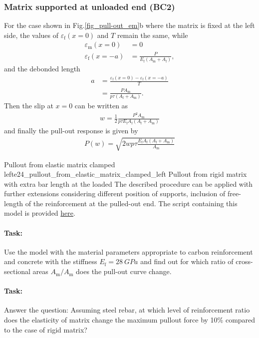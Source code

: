\documentclass[main.tex]{subfiles}
\begin{document}
\subsubsection{Matrix supported at unloaded end (BC2)}
For the case shown in Fig.\ref{fig_pull-out_em}b where the matrix is fixed at the left side, the values of $\varepsilon_\mathrm{f}(x=0)$ and $T$ remain the same, while
\begin{align}
   \varepsilon_\mathrm{m}(x=0) &= 0 \\
   \varepsilon_\mathrm{f}(x=-a) &= \frac{P}{E_\mathrm{f}(A_\mathrm{m}+A_\mathrm{f})},
\end{align}
and the debonded length
\begin{align}
      a &= \frac{\varepsilon_\mathrm{f}(x=0) - \varepsilon_\mathrm{f}(x=-a)}{T} \\
    &= \frac{P A_\mathrm{m}}{p\tau (A_\mathrm{f}+A_\mathrm{m})}.
\end{align}
Then the slip at $x=0$ can be written as 
\begin{align}
      w = \frac{1}{2}\frac{P^2A_\mathrm{m}}{p\tau E_\mathrm{f}A_\mathrm{f}(A_\mathrm{f}+A_\mathrm{m})}
\end{align}
and finally the pull-out response is given by
\begin{align}
      P(w) =  \sqrt{2wp\tau \frac{E_\mathrm{f}A_\mathrm{f}(A_\mathrm{f}+A_\mathrm{m})}{A_\mathrm{m}}}
\end{align}

\begin{bmcsex}{Pullout from elastic matrix clamped left}{e24_pullout_from_elastic_matrix_clamped_left}
Pullout from rigid matrix with extra bar length at the loaded 
The described procedure can be applied with further extensions considering different position of supports, inclusion of free-length of the reinforcement at the pulled-out end. The script containing this model is provided 
\href{https://moodle.rwth-aachen.de/pluginfile.php/261132/mod_folder/content/0/example_2.4_pull-out_from_elastic_matrix_supported_at_the_unloaded_end.ipynb?forcedownload=1}{here}.

\paragraph{Task:} Use the model with the material parameters appropriate to carbon reinforcement and concrete with the stiffness $E_\mathrm{f} = 28~GPa$ and find out for which ratio of cross-sectional areas $A_\mathrm{m}/A_\mathrm{m}$ 
does the pull-out curve change.
\paragraph{Task:} Answer the question: Assuming steel rebar, at which level of reinforcement ratio does the elasticity of matrix change the maximum pullout force by 10\% compared to the case of rigid matrix? 

\end{bmcsex}
\end{document}
